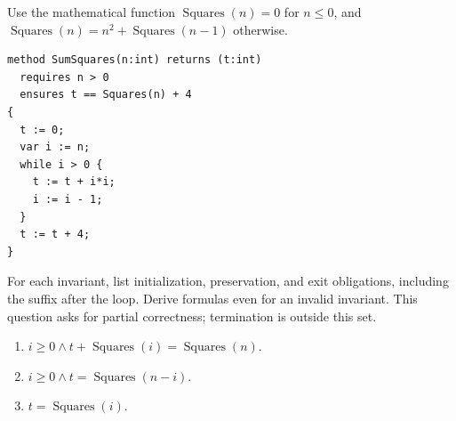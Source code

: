 \clearpage
{}
Use the mathematical function $\operatorname{Squares}(n)=0$ for $n\leq 0$,
and $\operatorname{Squares}(n)=n^2+\operatorname{Squares}(n-1)$ otherwise.
\par\noindent\begin{minipage}{\linewidth}
\begin{lstlisting}
method SumSquares(n:int) returns (t:int)
  requires n > 0
  ensures t == Squares(n) + 4
{
  t := 0;
  var i := n;
  while i > 0 {
    t := t + i*i;
    i := i - 1;
  }
  t := t + 4;
}
\end{lstlisting}
\end{minipage}\par
For each invariant, list initialization, preservation, and exit obligations,
including the suffix after the loop. Derive formulas even for an invalid invariant.
This question asks for partial correctness; termination is outside this set.
\begin{enumerate}[label=(\alph*)]
\item $i\geq0\land t+\operatorname{Squares}(i)=\operatorname{Squares}(n)$.
\item $i\geq0\land t=\operatorname{Squares}(n-i)$.
\item $t=\operatorname{Squares}(i)$.
\end{enumerate}

